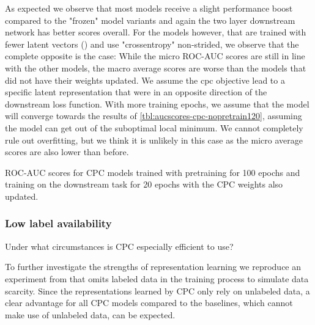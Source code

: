 As expected we observe that most models receive a slight performance boost compared to the "frozen" model variants and again the two layer downstream network has better scores overall. 
For the models however, that are trained with fewer latent vectors () and use "crossentropy" non-strided, we observe that the complete opposite is the case: While the micro ROC-AUC scores are still in line with the other models, the macro average scores are worse than the models that did not have their weights updated. We assume the cpc objective lead to a specific latent representation that were in an opposite direction of the downstream loss function. With more training epochs, we assume that the model will converge towards the results of \autoref{tbl:aucscores-cpc-nopretrain120}, assuming the model can get out of the suboptimal local minimum. We cannot completely rule out overfitting, but we think it is unlikely in this case as the micro average scores are also lower than before.
\begin{table}\centering
	\resizebox{\textwidth}{!}{
		
	}
	\caption*{\small ROC-AUC scores for CPC models trained with pretraining for 100 epochs and training on the downstream task for 20 epochs with the CPC weights also updated.}
	\label{tbl:aucscores-cpc-pretrain-unfrozen}
\end{table}





\subsubsection{Low label availability}\label{section:lowlabel}
Under what circumstances is CPC especially efficient to use?

To further investigate the strengths of representation learning we reproduce an experiment from \autocite{cpcdataefficient} that omits labeled data in the training process to simulate data scarcity. Since the representations learned by CPC only rely on unlabeled data, a clear advantage for all CPC models compared to the baselines, which cannot make use of unlabeled data, can be expected. 

